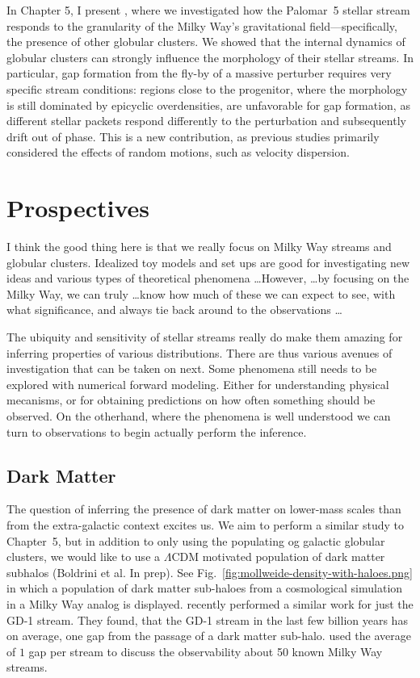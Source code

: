     In Chapter 5, I present \citet{2025A&A...699A.289F}, where we investigated how the Palomar~5 stellar stream responds to the granularity of the Milky Way's gravitational field—specifically, the presence of other globular clusters. We showed that the internal dynamics of globular clusters can strongly influence the morphology of their stellar streams. In particular, gap formation from the fly-by of a massive perturber requires very specific stream conditions: regions close to the progenitor, where the morphology is still dominated by epicyclic overdensities, are unfavorable for gap formation, as different stellar packets respond differently to the perturbation and subsequently drift out of phase. This is a new contribution, as previous studies primarily considered the effects of random motions, such as velocity dispersion.

\section{Prospectives}
    I think the good thing here is that we really focus on Milky Way streams and globular clusters. Idealized toy models and set ups are good for investigating new ideas and various types of theoretical phenomena \dots However, \dots by focusing on the Milky Way, we can truly \dots know how much of these we can expect to see, with what significance, and always tie back around to the observations \dots

    The ubiquity and sensitivity of stellar streams really do make them amazing for inferring properties of various distributions. There are thus various avenues of investigation that can be taken on next. Some phenomena still needs to be explored with numerical forward modeling. Either for understanding physical mecanisms, or for obtaining predictions on how often something should be observed. On the otherhand, where the phenomena is well understood we can turn to observations to begin actually perform the inference. 

    \subsection{Dark Matter}
        The question of inferring the presence of dark matter on lower-mass scales than from the extra-galactic context excites us. We aim to perform a similar study to Chapter~5, but in addition to only using the populating og galactic globular clusters, we would like to use a $\Lambda$CDM motivated population of dark matter subhalos (Boldrini et al. In prep). See Fig.~\ref{fig:mollweide-density-with-haloes.png} in which a population of dark matter sub-haloes from a cosmological simulation in a Milky Way analog is displayed. \citet{2024arXiv241213144A} recently performed a similar work for just the GD-1 stream. They found, that the GD-1 stream in the last few billion years has on average, one gap from the passage of a dark matter sub-halo. \citet{2025arXiv250207781L} used the average of $1$ gap per stream to discuss the observability about 50 known Milky Way streams. 

